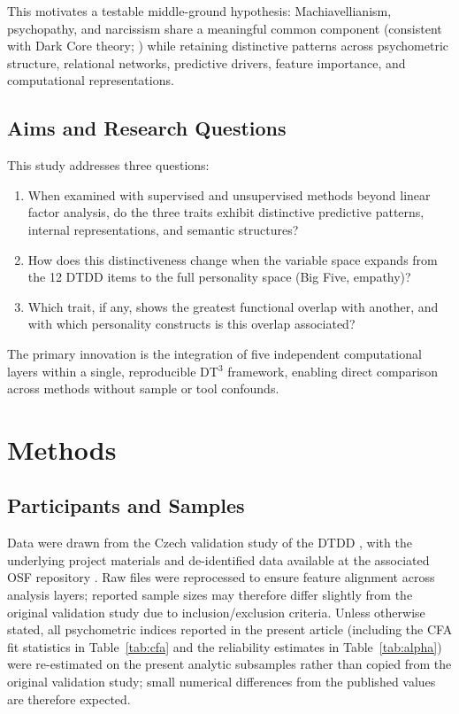 \documentclass[11pt,twocolumn]{article}
\begin{document}
This motivates a testable middle-ground hypothesis: Machiavellianism, psychopathy, and narcissism share a meaningful common component (consistent with Dark Core theory; \citealp{moshagen2018}) while retaining distinctive patterns across psychometric structure, relational networks, predictive drivers, feature importance, and computational representations.

\subsection{Aims and Research Questions}

This study addresses three questions:
\begin{enumerate}[leftmargin=1.2em,itemsep=0pt,topsep=2pt]
\item When examined with supervised and unsupervised methods beyond linear factor analysis, do the three traits exhibit distinctive predictive patterns, internal representations, and semantic structures?
\item How does this distinctiveness change when the variable space expands from the 12 DTDD items to the full personality space (Big Five, empathy)?
\item Which trait, if any, shows the greatest functional overlap with another, and with which personality constructs is this overlap associated?
\end{enumerate}

The primary innovation is the integration of five independent computational layers within a single, reproducible DT$^3$ framework, enabling direct comparison across methods without sample or tool confounds.

\section{Methods}

\subsection{Participants and Samples}

Data were drawn from the Czech validation study of the DTDD \citep{zivna2025}, with the underlying project materials and de-identified data available at the associated OSF repository \citep{zivna2023osf}. Raw files were reprocessed to ensure feature alignment across analysis layers; reported sample sizes may therefore differ slightly from the original validation study due to inclusion/exclusion criteria. Unless otherwise stated, all psychometric indices reported in the present article (including the CFA fit statistics in Table~\ref{tab:cfa} and the reliability estimates in Table~\ref{tab:alpha}) were re-estimated on the present analytic subsamples rather than copied from the original validation study; small numerical differences from the published values are therefore expected.
\end{document}
